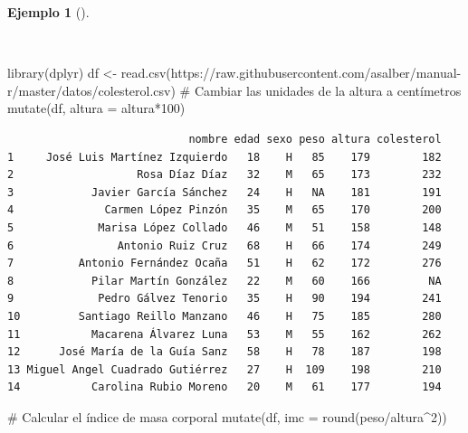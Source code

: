\documentclass[
  a4paper,
]{scrreport}
\newenvironment{Shaded}{\begin{snugshade}}{\end{snugshade}}
\newcommand{\AttributeTok}[1]{\textcolor[rgb]{0.40,0.45,0.13}{#1}}
\newcommand{\CommentTok}[1]{\textcolor[rgb]{0.37,0.37,0.37}{#1}}
\newcommand{\DecValTok}[1]{\textcolor[rgb]{0.68,0.00,0.00}{#1}}
\newcommand{\FunctionTok}[1]{\textcolor[rgb]{0.28,0.35,0.67}{#1}}
\newcommand{\NormalTok}[1]{\textcolor[rgb]{0.00,0.23,0.31}{#1}}
\newcommand{\OtherTok}[1]{\textcolor[rgb]{0.00,0.23,0.31}{#1}}
\newcommand{\SpecialCharTok}[1]{\textcolor[rgb]{0.37,0.37,0.37}{#1}}
\newcommand{\StringTok}[1]{\textcolor[rgb]{0.13,0.47,0.30}{#1}}
\theoremstyle{definition}
\theoremstyle{definition}
\newtheorem{example}{Ejemplo}[chapter]
\theoremstyle{remark}
\begin{document}
\begin{example}[]\protect\hypertarget{exm-mutate}{}\label{exm-mutate}

~

\begin{Shaded}
\begin{Highlighting}[]
\FunctionTok{library}\NormalTok{(dplyr)}
\NormalTok{df }\OtherTok{\textless{}{-}} \FunctionTok{read.csv}\NormalTok{(}\StringTok{\textquotesingle{}https://raw.githubusercontent.com/asalber/manual{-}r/master/datos/colesterol.csv\textquotesingle{}}\NormalTok{)}
\CommentTok{\# Cambiar las unidades de la altura a centímetros}
\FunctionTok{mutate}\NormalTok{(df, }\AttributeTok{altura =}\NormalTok{ altura}\SpecialCharTok{*}\DecValTok{100}\NormalTok{)}
\end{Highlighting}
\end{Shaded}

\begin{verbatim}
                            nombre edad sexo peso altura colesterol
1     José Luis Martínez Izquierdo   18    H   85    179        182
2                   Rosa Díaz Díaz   32    M   65    173        232
3            Javier García Sánchez   24    H   NA    181        191
4              Carmen López Pinzón   35    M   65    170        200
5             Marisa López Collado   46    M   51    158        148
6                Antonio Ruiz Cruz   68    H   66    174        249
7          Antonio Fernández Ocaña   51    H   62    172        276
8            Pilar Martín González   22    M   60    166         NA
9             Pedro Gálvez Tenorio   35    H   90    194        241
10         Santiago Reillo Manzano   46    H   75    185        280
11           Macarena Álvarez Luna   53    M   55    162        262
12      José María de la Guía Sanz   58    H   78    187        198
13 Miguel Angel Cuadrado Gutiérrez   27    H  109    198        210
14           Carolina Rubio Moreno   20    M   61    177        194
\end{verbatim}

\begin{Shaded}
\begin{Highlighting}[]
\CommentTok{\# Calcular el índice de masa corporal}
\FunctionTok{mutate}\NormalTok{(df, }\AttributeTok{imc =} \FunctionTok{round}\NormalTok{(peso}\SpecialCharTok{/}\NormalTok{altura}\SpecialCharTok{\^{}}\DecValTok{2}\NormalTok{))}
\end{Highlighting}
\end{Shaded}


\end{example}
\end{document}
